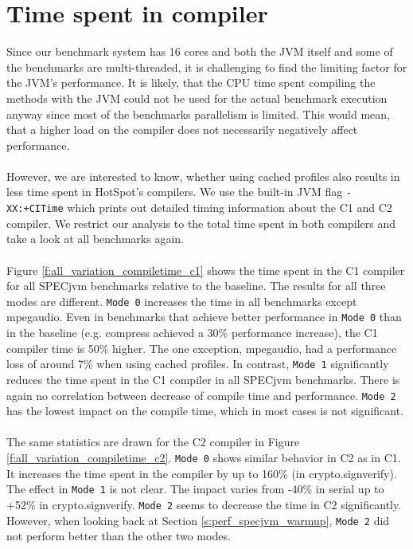 \section{Time spent in compiler}
\label{s:perf_compiletime}
Since our benchmark system has 16 cores and both the JVM itself and some of the benchmarks are multi-threaded, it is challenging to find the limiting factor for the JVM's performance. It is likely, that the CPU time spent compiling the methods with the JVM could not be used for the actual benchmark execution anyway since most of the benchmarks parallelism is limited.
This would mean, that a higher load on the compiler does not necessarily negatively affect performance.
\\\\
However, we are interested to know, whether using cached profiles also results in less time spent in HotSpot's compilers.
We use the built-in JVM flag \texttt{-XX:+CITime} which prints out detailed timing information about the C1 and C2 compiler.
We restrict our analysis to the total time spent in both compilers and take a look at all benchmarks again.
\\\\
Figure \ref{f:all_variation_compiletime_c1} shows the time spent in the C1 compiler for all SPECjvm benchmarks relative to the baseline. The results for all three modes are different. \texttt{Mode 0} increases the time in all benchmarks except mpegaudio. Even in benchmarks that achieve better performance in \texttt{Mode 0} than in the baseline (e.g. compress achieved a 30\% performance increase), the C1 compiler time is 50\% higher. The one exception, mpegaudio, had a performance loss of around 7\% when using cached profiles.
In contrast, \texttt{Mode 1} significantly reduces the time spent in the C1 compiler in all SPECjvm benchmarks. There is again no correlation between decrease of compile time and performance.
\texttt{Mode 2} has the lowest impact on the compile time, which in most cases is not significant.
\\\\
The same statistics are drawn for the C2 compiler in Figure \ref{f:all_variation_compiletime_c2}. 
\texttt{Mode 0} shows similar behavior in C2 as in C1. It increases the time spent in the compiler by up to 160\% (in crypto.signverify).
The effect in \texttt{Mode 1} is not clear. The impact varies from -40\% in serial up to +52\% in crypto.signverify. \texttt{Mode 2} seems to decrease the time in C2 significantly. However, when looking back at Section \ref{s:perf_specjvm_warmup}, \texttt{Mode 2} did not perform better than the other two modes.
